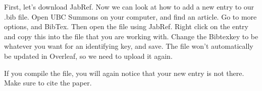 \documentclass[paper=a4, fontsize=11pt]{scrartcl}
\numberwithin{equation}{section}		%
\numberwithin{table}{section}				%
\begin{document}
First, let's download JabRef. Now we can look at how to add a new entry to our .bib file. Open UBC Summons on your computer, and find an article. Go to more options, and BibTex. Then open the file using JabRef. Right click on the entry and copy this into the file that you are working with. Change the Bibtexkey to be whatever you want for an identifying key, and save. The file won't automatically be updated in Overleaf, so we need to upload it again. 

If you compile the file, you will again notice that your new entry is not there. Make sure to cite the paper. 

 
\clearpage
 




\end{document}
